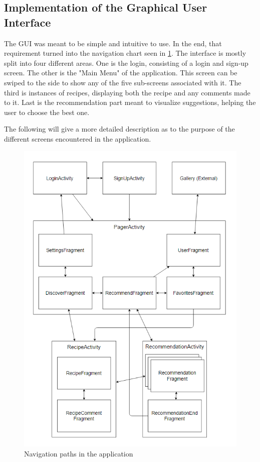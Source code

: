 \subsection{Implementation of the Graphical User Interface}
\label{subsec:implgui}

The GUI was meant to be simple and intuitive to use. In the end, that requirement turned into the navigation chart seen in \ref{fig:application_navigation}. The interface is mostly split into four different areas. One is the login, consisting of a login and sign-up screen. The other is the "Main Menu" of the application. This screen can be swiped to the side to show any of the five sub-screens associated with it. The third is instances of recipes, displaying both the recipe and any comments made to it. Last is the recommendation part meant to visualize suggestions, helping the user to choose the best one.

The following will give a more detailed description as to the purpose of the different screens encountered in the application.

\begin{figure}[H]
	\centering
	\includegraphics[width=\textwidth]{Pictures/application_navigation.png}
	\caption{Navigation paths in the application}
	\label{fig:application_navigation}
\end{figure}


